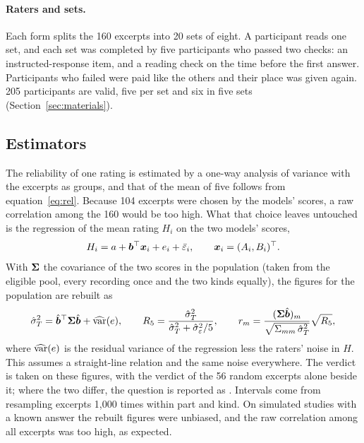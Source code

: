 \paragraph{Raters and sets.} Each form splits the 160 excerpts into 20 sets of eight. A participant reads one
set, and each set was completed by five participants who passed two checks: an instructed-response item, and a
reading check on the time before the first answer. Participants who failed were paid like the others and their
place was given again. 205 participants are valid, five per set and six in five sets
(Section~\ref{sec:materials}).

\subsection{Estimators}\label{sec:firstmethods}

The reliability of one rating is estimated by a one-way analysis of variance with the excerpts as groups, and
that of the mean of five follows from equation~\eqref{eq:rel}. Because 104 excerpts were chosen by the models'
scores, a raw correlation among the 160 would be too high. What that choice leaves untouched is the regression
of the mean rating $H_i$ on the two models' scores,
\begin{equation}
  H_i = a + \bm b^\top \bm{x}_i + e_i + \bar\varepsilon_i , \qquad \bm{x}_i = (A_i, B_i)^\top .
\end{equation}
With $\bm{\Sigma}$ the covariance of the two scores in the population (taken from the eligible pool, every recording
once and the two kinds equally), the figures for the population are rebuilt as
\begin{equation}
  \hat\sigma_T^2 = \hat{\bm b}^\top\bm{\Sigma}\hat{\bm b} + \widehat{\operatorname{var}}(e), \qquad
  R_{5} = \frac{\hat\sigma_T^2}{\hat\sigma_T^2 + \hat\sigma_\varepsilon^2/5}, \qquad
  r_m = \frac{(\bm{\Sigma}\hat{\bm b})_m}{\sqrt{\Sigma_{mm}\,\hat\sigma_T^2}}\sqrt{R_{5}} ,
\end{equation}
where $\widehat{\operatorname{var}}(e)$ is the residual variance of the regression less the raters' noise in $H$. This assumes
a straight-line relation and the same noise everywhere. The verdict is taken on these figures, with the verdict
of the 56 random excerpts alone beside it; where the two differ, the question is reported as .
Intervals come from resampling excerpts 1{,}000 times within part and kind. On simulated studies with a known
answer the rebuilt figures were unbiased, and the raw correlation among all excerpts was too high, as expected.

